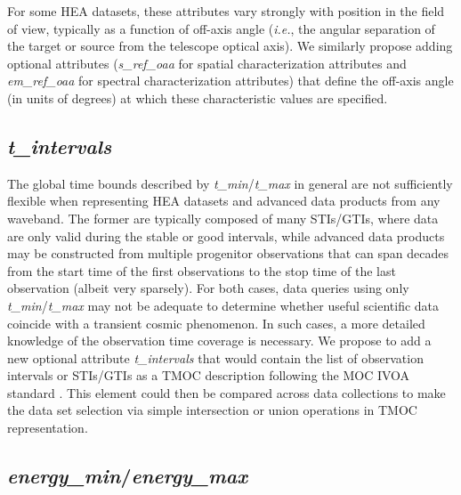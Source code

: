 \documentclass[11pt,a4paper]{ivoa}
\begin{document}
For some \gls{HEA} datasets, these attributes vary strongly with position in the field of view, typically as a function of off-axis angle ({\em i.e.\/}, the angular separation of the target or source from the telescope optical axis). We similarly propose adding optional attributes ({\em s\_ref\_oaa\/} for spatial characterization attributes and {\em em\_ref\_oaa\/} for spectral characterization attributes) that define the off-axis angle (in units of degrees) at which these characteristic values are specified.

\subsection{{\em t\_intervals}}

The global time bounds described by {\em t\_min\/}/{\em t\_max} in general are not sufficiently flexible when representing \gls{HEA} datasets and advanced data products from any waveband.  The former are typically composed of many \glspl{STI}/\glspl{GTI}, where data are only valid during the stable or good intervals, while advanced data products may be constructed from multiple progenitor observations that can span decades from the start time of the first observations to the stop time of the last observation (albeit very sparsely).  For both cases, data queries using only {\em t\_min\/}/{\em t\_max} may not be adequate to determine whether useful scientific data coincide with a transient cosmic phenomenon.  In such cases, a more detailed knowledge of the observation time coverage is necessary.  We propose to add a new optional attribute {\em t\_intervals} that would contain the list of observation intervals or STIs/GTIs as a TMOC description following the \gls{MOC} IVOA standard  \citep{2022ivoa.spec.0727F}. This element could then be compared across data collections to make the data set selection via simple intersection or union operations in TMOC representation.

\subsection{{\em energy\_min\/}/{\em energy\_max\/}}
\end{document}
